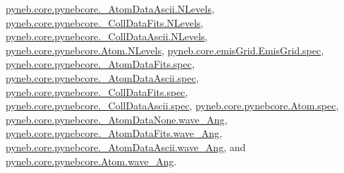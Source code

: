 \hyperlink{pynebcore_8py_source_l00404}{pyneb.\+core.\+pynebcore.\+\_\+\+Atom\+Data\+Ascii.\+N\+Levels}, \hyperlink{pynebcore_8py_source_l00637}{pyneb.\+core.\+pynebcore.\+\_\+\+Coll\+Data\+Fits.\+N\+Levels}, \hyperlink{pynebcore_8py_source_l00984}{pyneb.\+core.\+pynebcore.\+\_\+\+Coll\+Data\+Ascii.\+N\+Levels}, \hyperlink{pynebcore_8py_source_l01260}{pyneb.\+core.\+pynebcore.\+Atom.\+N\+Levels}, \hyperlink{emis_grid_8py_source_l00046}{pyneb.\+core.\+emis\+Grid.\+Emis\+Grid.\+spec}, \hyperlink{pynebcore_8py_source_l00084}{pyneb.\+core.\+pynebcore.\+\_\+\+Atom\+Data\+Fits.\+spec}, \hyperlink{pynebcore_8py_source_l00305}{pyneb.\+core.\+pynebcore.\+\_\+\+Atom\+Data\+Ascii.\+spec}, \hyperlink{pynebcore_8py_source_l00561}{pyneb.\+core.\+pynebcore.\+\_\+\+Coll\+Data\+Fits.\+spec}, \hyperlink{pynebcore_8py_source_l00911}{pyneb.\+core.\+pynebcore.\+\_\+\+Coll\+Data\+Ascii.\+spec}, \hyperlink{pynebcore_8py_source_l01166}{pyneb.\+core.\+pynebcore.\+Atom.\+spec}, \hyperlink{pynebcore_8py_source_l00057}{pyneb.\+core.\+pynebcore.\+\_\+\+Atom\+Data\+None.\+wave\+\_\+\+Ang}, \hyperlink{pynebcore_8py_source_l00165}{pyneb.\+core.\+pynebcore.\+\_\+\+Atom\+Data\+Fits.\+wave\+\_\+\+Ang}, \hyperlink{pynebcore_8py_source_l00426}{pyneb.\+core.\+pynebcore.\+\_\+\+Atom\+Data\+Ascii.\+wave\+\_\+\+Ang}, and \hyperlink{pynebcore_8py_source_l01198}{pyneb.\+core.\+pynebcore.\+Atom.\+wave\+\_\+\+Ang}.


